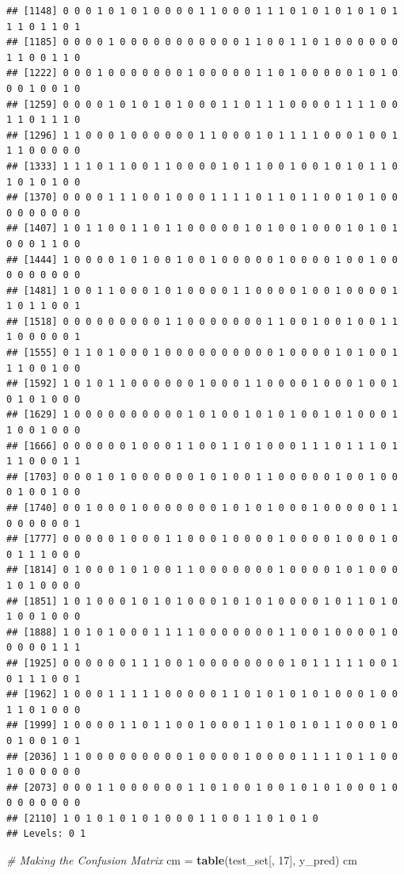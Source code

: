 \documentclass[
]{article}
\newenvironment{Shaded}{\begin{snugshade}}{\end{snugshade}}
\newcommand{\CommentTok}[1]{\textcolor[rgb]{0.56,0.35,0.01}{\textit{#1}}}
\newcommand{\DecValTok}[1]{\textcolor[rgb]{0.00,0.00,0.81}{#1}}
\newcommand{\KeywordTok}[1]{\textcolor[rgb]{0.13,0.29,0.53}{\textbf{#1}}}
\newcommand{\NormalTok}[1]{#1}
\newcommand{\StringTok}[1]{\textcolor[rgb]{0.31,0.60,0.02}{#1}}
\begin{document}
\begin{verbatim}
## [1148] 0 0 0 1 0 1 0 1 0 0 0 0 1 1 0 0 0 1 1 1 0 1 0 1 0 1 0 1 0 1 1 1 0 1 1 0 1
## [1185] 0 0 0 0 1 0 0 0 0 0 0 0 0 0 0 0 1 1 0 0 1 1 0 1 0 0 0 0 0 0 1 1 0 0 1 1 0
## [1222] 0 0 0 1 0 0 0 0 0 0 0 1 0 0 0 0 0 1 1 0 1 0 0 0 0 0 1 0 1 0 0 0 1 0 0 1 0
## [1259] 0 0 0 0 1 0 1 0 1 0 1 0 0 0 1 1 0 1 1 1 0 0 0 0 1 1 1 1 0 0 1 1 0 1 1 1 0
## [1296] 1 1 0 0 0 1 0 0 0 0 0 0 1 1 0 0 0 1 0 1 1 1 1 0 0 0 1 0 0 1 1 1 0 0 0 0 0
## [1333] 1 1 1 0 1 1 0 0 1 1 0 0 0 0 1 0 1 1 0 0 1 0 0 1 0 1 0 1 1 0 1 0 1 0 1 0 0
## [1370] 0 0 0 0 1 1 1 0 0 1 0 0 0 1 1 1 1 0 1 1 0 1 1 0 0 1 0 1 0 0 0 0 0 0 0 0 0
## [1407] 1 0 1 1 0 0 1 1 0 1 1 0 0 0 0 0 1 0 1 0 0 1 0 0 0 1 0 1 0 1 0 0 0 1 1 0 0
## [1444] 1 0 0 0 0 1 0 1 0 0 1 0 0 1 0 0 0 0 0 1 0 0 0 0 1 0 0 1 0 0 0 0 0 0 0 0 0
## [1481] 1 0 0 1 1 0 0 0 1 0 1 0 0 0 0 1 1 0 0 0 0 1 0 0 1 0 0 0 0 1 1 0 1 1 0 0 1
## [1518] 0 0 0 0 0 0 0 0 0 1 1 0 0 0 0 0 0 0 1 1 0 0 1 0 0 1 0 0 1 1 1 0 0 0 0 0 1
## [1555] 0 1 1 0 1 0 0 0 1 0 0 0 0 0 0 0 0 0 0 1 0 0 0 0 1 0 1 0 0 1 1 1 0 0 1 0 0
## [1592] 1 0 1 0 1 1 0 0 0 0 0 0 1 0 0 0 1 1 0 0 0 0 1 0 0 0 1 0 0 1 0 1 0 1 0 0 0
## [1629] 1 0 0 0 0 0 0 0 0 0 0 1 0 1 0 0 1 0 1 0 1 0 0 1 0 1 0 0 0 1 1 0 0 1 0 0 0
## [1666] 0 0 0 0 0 0 1 0 0 0 1 1 0 0 1 1 0 1 0 0 0 1 1 1 0 1 1 1 0 1 1 1 0 0 0 1 1
## [1703] 0 0 0 1 0 1 0 0 0 0 0 0 1 0 1 0 0 1 1 0 0 0 0 0 1 0 0 1 0 0 0 1 0 0 1 0 0
## [1740] 0 0 1 0 0 0 1 0 0 0 0 0 0 0 1 0 1 0 1 0 0 0 1 0 0 0 0 0 1 1 0 0 0 0 0 0 1
## [1777] 0 0 0 0 0 1 0 0 0 1 1 0 0 0 1 0 0 0 0 1 0 0 0 0 1 0 0 0 1 0 0 1 1 1 0 0 0
## [1814] 0 1 0 0 0 1 0 1 0 0 1 1 0 0 0 0 0 0 0 1 0 0 0 0 1 0 1 0 0 0 1 0 1 0 0 0 0
## [1851] 1 0 1 0 0 0 1 0 1 0 1 0 0 0 1 0 1 0 1 0 0 0 0 1 0 1 1 0 1 0 1 0 0 1 0 0 0
## [1888] 1 0 1 0 1 0 0 0 1 1 1 1 0 0 0 0 0 0 0 1 1 0 0 1 0 0 0 0 1 0 0 0 0 0 1 1 1
## [1925] 0 0 0 0 0 0 1 1 1 0 0 1 0 0 0 0 0 0 0 0 1 0 1 1 1 1 1 0 0 1 0 1 1 1 0 0 1
## [1962] 1 0 0 0 1 1 1 1 1 0 0 0 0 0 1 1 0 1 0 1 0 1 0 1 0 0 0 1 0 0 1 1 0 1 0 0 0
## [1999] 1 0 0 0 0 1 1 0 1 1 0 0 1 0 0 0 1 1 0 1 0 1 0 1 1 0 0 0 1 0 0 1 0 0 1 0 1
## [2036] 1 1 0 0 0 0 0 0 0 0 0 1 0 0 0 0 1 0 0 0 0 1 1 1 1 0 1 1 0 0 1 0 0 0 0 0 0
## [2073] 0 0 0 1 1 0 0 0 0 0 0 1 1 0 1 0 0 1 0 0 1 0 1 0 1 0 0 0 1 0 0 0 0 0 0 0 0
## [2110] 1 0 1 0 1 0 1 0 1 0 0 0 1 1 0 0 1 1 0 1 0 1 0
## Levels: 0 1
\end{verbatim}

\begin{Shaded}
\begin{Highlighting}[]
\CommentTok{# Making the Confusion Matrix}
\NormalTok{cm =}\StringTok{ }\KeywordTok{table}\NormalTok{(test_set[, }\DecValTok{17}\NormalTok{], y_pred)}
\NormalTok{cm}
\end{Highlighting}
\end{Shaded}
\end{document}
